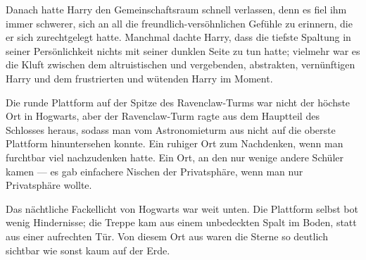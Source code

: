 Danach hatte Harry den Gemeinschaftsraum schnell verlassen, denn es fiel ihm immer schwerer, sich an all die freundlich-versöhnlichen Gefühle zu erinnern, die er sich zurechtgelegt hatte.
Manchmal dachte Harry, dass die tiefste Spaltung in seiner Persönlichkeit nichts mit seiner dunklen Seite zu tun hatte; vielmehr war es die Kluft zwischen dem altruistischen und vergebenden, abstrakten, vernünftigen Harry und dem frustrierten und wütenden Harry im Moment.

Die runde Plattform auf der Spitze des Ravenclaw-Turms war nicht der höchste Ort in Hogwarts, aber der Ravenclaw-Turm ragte aus dem Hauptteil des Schlosses heraus, sodass man vom Astronomieturm aus nicht auf die oberste Plattform hinuntersehen konnte. Ein ruhiger Ort zum Nachdenken, wenn man furchtbar viel nachzudenken hatte. Ein Ort, an den nur wenige andere Schüler kamen — es gab einfachere Nischen der Privatsphäre, wenn man nur Privatsphäre wollte.

Das nächtliche Fackellicht von Hogwarts war weit unten. Die Plattform selbst bot wenig Hindernisse; die Treppe kam aus einem unbedeckten Spalt im Boden, statt aus einer aufrechten Tür. Von diesem Ort aus waren die Sterne so deutlich sichtbar wie sonst kaum auf der Erde.

